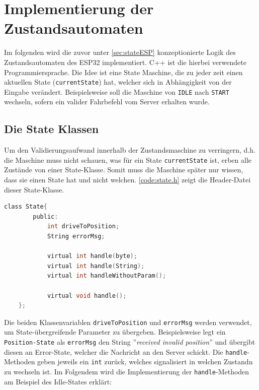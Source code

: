 \chapter{Implementierung der Zustandsautomaten}
Im folgenden wird die zuvor unter \autoref{sec:stateESP} konzeptionierte Logik des Zustandsautomaten des ESP32 implementiert.
C++ ist die hierbei verwendete Programmiersprache. Die Idee ist eine State Maschine, die zu jeder zeit einen aktuellen State (\texttt{currentState}) hat, welcher sich in Abhängigkeit von der Eingabe verändert. Beispielsweise soll die Maschine von \texttt{IDLE} nach \texttt{START} wechseln, sofern ein valider Fahrbefehl vom Server erhalten wurde.

\section{Die State Klassen}
Um den Validierungsaufwand innerhalb der Zustandsmaschine zu verringern, d.h. die Maschine muss nicht schauen, was für ein State \texttt{currentState} ist, erben alle Zustände von einer State-Klasse. Somit muss die Maschine später nur wissen, dass sie einen State hat und nicht welchen.
\autoref{code:state.h} zeigt die Header-Datei dieser State-Klasse.

\begin{lstlisting}[language=c, style=dhpaperdefault]
	class State{
		public:
			int driveToPosition;
			String errorMsg;

			virtual int handle(byte);
			virtual int handle(String);
			virtual int handleWithoutParam();
			
			virtual void handle();
	};
\end{lstlisting}

Die beiden Klassenvariablen \texttt{driveToPosition} und \texttt{errorMsg} werden verwendet, um State-übergreifende Parameter zu übergeben. Beispielsweise legt ein \texttt{Position-State} als \texttt{errorMsg} den String ''\textit{received invalid position}'' und übergibt diesen an Error-State, welcher die Nachricht an den Server schickt.
Die \texttt{handle}-Methoden geben jeweils ein \texttt{int} zurück, welches signalisiert in welchen Zustandn zu wechseln ist.
Im Folgendem wird die Implementierung der \texttt{handle}-Methoden am Beispiel des Idle-States erklärt:

